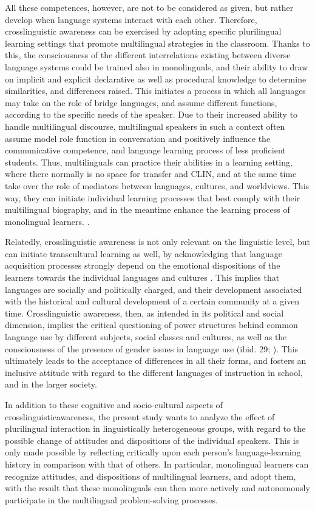 \documentclass[output=paper]{../langscibook}
\begin{document}
All these competences, however, are not to be considered as given, but rather develop when language systems interact with each other. Therefore, crosslinguistic awareness can be exercised by adopting specific plurilingual learning settings that promote multilingual strategies in the classroom. Thanks to this, the consciousness of the different interrelations existing between diverse language systems could be trained also in monolinguals, and their ability to draw on implicit and explicit declarative as well as procedural knowledge to determine similarities, and differences raised. This initiates a process in which all languages may take on the role of bridge languages, and assume different functions, according to the specific needs of the speaker. Due to their increased ability to handle multilingual discourse, multilingual speakers in such a context often assume model role function in conversation and positively influence the communicative competence, and language learning process of less proficient students. Thus, multilinguals can practice their abilities in a learning setting, where there normally is no space for transfer and CLIN, and at the same time take over the role of mediators between languages, cultures, and worldviews. This way, they can initiate individual learning processes that best comply with their multilingual biography, and in the meantime enhance the learning process of monolingual learners. \citep{Jessner2006}.

Relatedly, crosslinguistic awareness is not only relevant on the linguistic level, but can initiate transcultural learning as well, by acknowledging that language acquisition processes strongly depend on the emotional dispositions of the learners towards the individual languages and cultures \citep[29]{Burwitz-Melzer2012}. This implies that languages are socially and politically charged, and their development associated with the historical and cultural development of a certain community at a given time. Crosslinguistic awareness, then, as intended in its political and social dimension, implies the critical questioning of power structures behind common language use by different subjects, social classes and cultures, as well as the consciousness of the presence of gender issues in language use (ibid. 29; \citealt[28f]{Morkotter2005}). This ultimately leads to the acceptance of differences in all their forms, and fosters an inclusive attitude with regard to the different languages of instruction in school, and in the larger society. 

In addition to these cognitive and socio-cultural aspects of crosslinguistic\linebreak awareness, the present study wants to analyze the effect of plurilingual interaction in linguistically heterogeneous groups, with regard to the possible change of attitudes and dispositions of the individual speakers. This is only made possible by reflecting critically upon each person’s language-learning history in comparison with that of others. In particular, monolingual learners can recognize attitudes, and dispositions of multilingual learners, and adopt them, with the result that these monolinguals can then more actively and autonomously participate in the multilingual problem-solving processes. 
\end{document}
